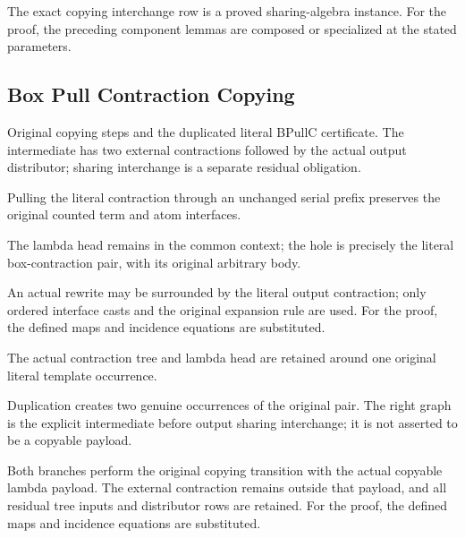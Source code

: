 The exact copying interchange row is a proved sharing-algebra instance.
For the proof, the preceding component lemmas are composed or specialized at the stated parameters.
\par{}

\subsection{Box Pull Contraction Copying}
Original copying steps and the duplicated literal BPullC certificate. The intermediate has two external contractions followed by the actual output distributor; sharing interchange is a separate residual obligation.

Pulling the literal contraction through an unchanged serial prefix preserves the original counted term and atom interfaces.
\par{}

The lambda head remains in the common context; the hole is precisely the literal box-contraction pair, with its original arbitrary body.
\par{}

An actual rewrite may be surrounded by the literal output contraction; only ordered interface casts and the original expansion rule are used.
For the proof, the defined maps and incidence equations are substituted.
\par{}

The actual contraction tree and lambda head are retained around one original literal template occurrence.
\par{}

Duplication creates two genuine occurrences of the original pair. The right graph is the explicit intermediate before output sharing interchange; it is not asserted to be a copyable payload.
\par{}

Both branches perform the original copying transition with the actual copyable lambda payload. The external contraction remains outside that payload, and all residual tree inputs and distributor rows are retained.
For the proof, the defined maps and incidence equations are substituted.
\par{}

